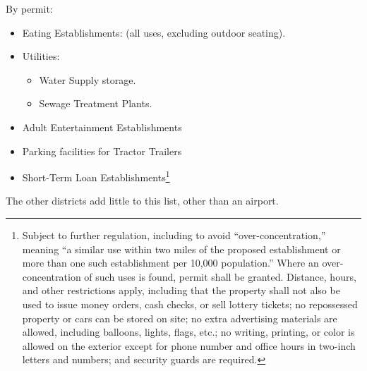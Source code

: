By permit:
\begin{itemize}
\item Eating Establishments: (all uses, excluding outdoor seating).

\item Utilities:
\begin{itemize}
\item Water Supply storage.

\item Sewage Treatment Plants.
\end{itemize}
\item Adult Entertainment Establishments 

\item Parking facilities for Tractor Trailers 

\item Short-Term Loan Establishments\footnote{Subject to further regulation,
including to avoid ``over-concentration,'' meaning ``a similar use within two
miles of the proposed establishment or more than one such establishment per
10,000 population.'' Where an over-concentration of such uses is found, permit
shall be granted. Distance, hours, and other restrictions apply, including that
the property shall not also be used to issue money orders, cash checks, or sell
lottery tickets; no repossessed property or cars can be stored on site; no extra
advertising materials are allowed, including balloons, lights, flags, etc.; no
writing, printing, or color is allowed on the exterior except for phone number
and office hours in two-inch letters and numbers; and security guards are
required.}
\end{itemize}
The other districts add little to this list, other than an airport.

